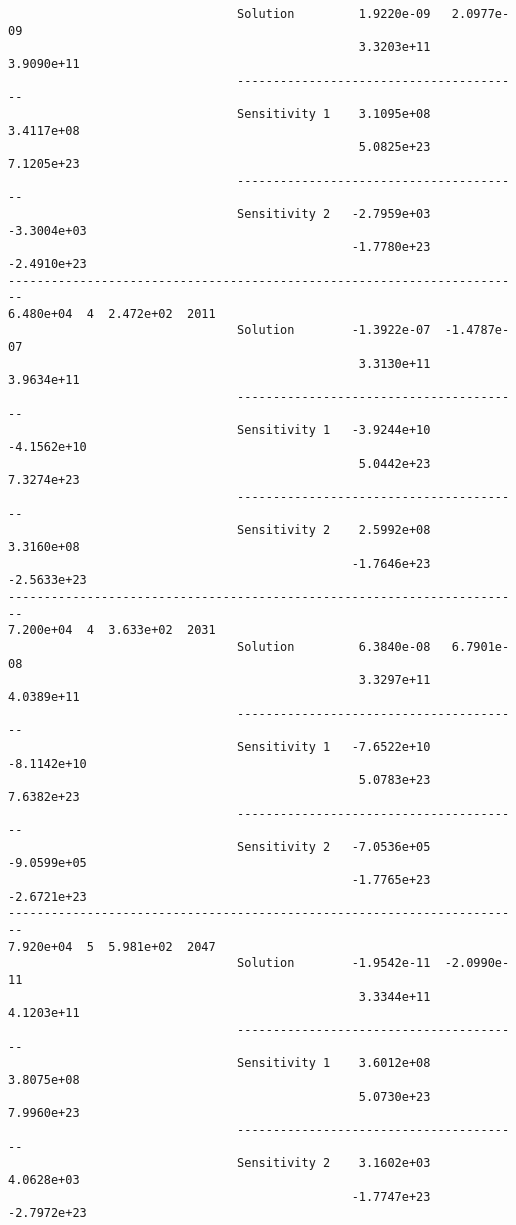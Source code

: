 \begin{verbatim}
                                Solution         1.9220e-09   2.0977e-09 
                                                 3.3203e+11   3.9090e+11 
                                ----------------------------------------
                                Sensitivity 1    3.1095e+08   3.4117e+08 
                                                 5.0825e+23   7.1205e+23 
                                ----------------------------------------
                                Sensitivity 2   -2.7959e+03  -3.3004e+03 
                                                -1.7780e+23  -2.4910e+23 
------------------------------------------------------------------------
6.480e+04  4  2.472e+02  2011
                                Solution        -1.3922e-07  -1.4787e-07 
                                                 3.3130e+11   3.9634e+11 
                                ----------------------------------------
                                Sensitivity 1   -3.9244e+10  -4.1562e+10 
                                                 5.0442e+23   7.3274e+23 
                                ----------------------------------------
                                Sensitivity 2    2.5992e+08   3.3160e+08 
                                                -1.7646e+23  -2.5633e+23 
------------------------------------------------------------------------
7.200e+04  4  3.633e+02  2031
                                Solution         6.3840e-08   6.7901e-08 
                                                 3.3297e+11   4.0389e+11 
                                ----------------------------------------
                                Sensitivity 1   -7.6522e+10  -8.1142e+10 
                                                 5.0783e+23   7.6382e+23 
                                ----------------------------------------
                                Sensitivity 2   -7.0536e+05  -9.0599e+05 
                                                -1.7765e+23  -2.6721e+23 
------------------------------------------------------------------------
7.920e+04  5  5.981e+02  2047
                                Solution        -1.9542e-11  -2.0990e-11 
                                                 3.3344e+11   4.1203e+11 
                                ----------------------------------------
                                Sensitivity 1    3.6012e+08   3.8075e+08 
                                                 5.0730e+23   7.9960e+23 
                                ----------------------------------------
                                Sensitivity 2    3.1602e+03   4.0628e+03 
                                                -1.7747e+23  -2.7972e+23 

\end{verbatim}
